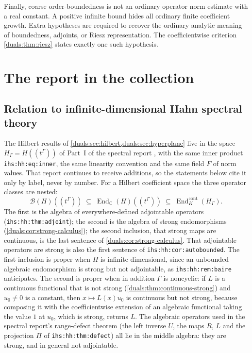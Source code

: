 \documentclass[11pt,letterpaper]{article}
\numberwithin{equation}{section}
\theoremstyle{definition}
\theoremstyle{remark}
\newcommand{\C}{\mathbb C}
\newcommand{\HG}{H_\Gamma}
\newcommand{\End}{\operatorname{End}}
\newcommand{\ihs}[1]{\texttt{ihs:#1}}
\begin{document}
Finally, coarse order-boundedness is not an ordinary operator norm
estimate with a real constant. A positive infinite bound hides all
ordinary finite coefficient growth. Extra hypotheses are required to
recover the ordinary analytic meaning of boundedness, adjoints, or
Riesz representation. The coefficientwise criterion
\cref{duals:thm:riesz} states exactly one such hypothesis.

\section{The report in the collection}\label{duals:sec:collection}

\subsection{Relation to infinite-dimensional Hahn spectral theory}
The Hilbert results of \cref{duals:sec:hilbert,duals:sec:hyperplane}
live in the space $\HG=H((t^\Gamma))$ of Part~I of the spectral report
\cite{RepoSpectral}, with the same inner product \ihs{hh:eq:inner}, the
same linearity convention and the same field $F$ of norm values. That
report continues to receive additions, so the statements below cite it
only by label, never by number. For a Hilbert coefficient space the three operator
classes are nested:
\[
 \mathcal B(H)((t^\Gamma))\;\subseteq\;\End_\C(H)((t^\Gamma))
 \;\subseteq\;\End_K^{\mathrm{cont}}(\HG).
\]
The first is the algebra of everywhere-defined adjointable operators
(\ihs{hh:thm:adjoint}); the second is the algebra of strong
endomorphisms (\cref{duals:cor:strong-calculus}); the second inclusion,
that strong maps are continuous, is the last sentence of
\cref{duals:cor:strong-calculus}. That adjointable
operators are strong is also the first sentence of
\ihs{hh:cor:autobounded}. The first inclusion is proper when $H$ is
infinite-dimensional, since an unbounded algebraic endomorphism is strong
but not adjointable, as \ihs{hh:rem:baire} anticipates. The second is
proper when in addition $\Gamma$ is noncyclic: if $L$ is a continuous
functional that is not strong (\cref{duals:thm:continuous-strong}) and
$u_0\ne0$ is a constant, then $x\mapsto L(x)u_0$ is continuous but not
strong, because composing it with the coefficientwise extension of an
algebraic functional taking the value $1$ at $u_0$, which is strong,
returns $L$. The
algebraic operators used in the spectral report's range-defect theorem
(the left inverse $U$, the maps $R$, $L$ and the projection $\Pi$ of
\ihs{hh:thm:defect}) all lie in the middle algebra: they are strong, and in
general not adjointable.
\end{document}

